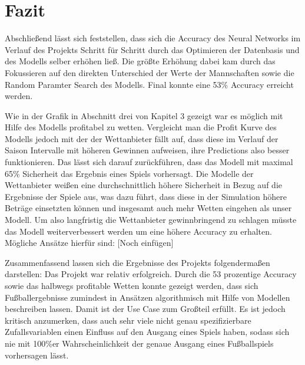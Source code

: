 \chapter{Fazit}

Abschließend lässt sich feststellen, dass sich die Accuracy des Neural Networks
im Verlauf des Projekts Schritt für Schritt durch das Optimieren der Datenbasis
und des Modells selber erhöhen ließ. Die größte Erhöhung dabei kam durch das Fokussieren
auf den direkten Unterschied der Werte der Mannschaften sowie die Random Paramter Search
des Modells. Final konnte eine 53\% Accuracy erreicht werden.

Wie in der Grafik in Abschnitt drei von Kapitel 3 gezeigt war es möglich mit Hilfe
des Modells profitabel zu wetten. Vergleicht man die Profit Kurve des Modells jedoch
mit der der Wettanbieter fällt auf, dass diese im Verlauf der Saison Intervalle mit
höheren Gewinnen aufweisen, ihre Predictions also besser funktionieren. Das lässt sich
darauf zurückführen, dass das Modell mit maximal 65\% Sicherheit das Ergebnis eines Spiels
vorhersagt. Die Modelle der Wettanbieter weißen eine durchschnittlich höhere Sicherheit in Bezug auf die
Ergebnisse der Spiele aus, was dazu führt, dass diese in der Simulation höhere Beträge
einsetzten können und insgesamt auch mehr Wetten eingehen als unser Modell.
Um also langfristig die Wettanbieter gewinnbringend zu schlagen müsste das Modell
weiterverbessert werden um eine höhere Accuracy zu erhalten. Mögliche Ansätze hierfür
sind: [Noch einfügen]

Zusammenfassend lassen sich die Ergebnisse des Projekts folgendermaßen darstellen:
Das Projekt war relativ erfolgreich. Durch die 53 prozentige Accuracy sowie das halbwegs
profitable Wetten konnte gezeigt werden, dass sich Fußballergebnisse zumindest in
Ansätzen algorithmisch mit Hilfe von Modellen beschreiben lassen. Damit ist der Use
Case zum Großteil erfüllt. Es ist jedoch kritisch anzumerken, dass auch sehr viele
nicht genau spezifizierbare Zufallsvariablen einen Einfluss auf den Ausgang
eines Spiels haben, sodass sich nie mit 100\%er Wahrscheinlichkeit der genaue Ausgang
eines Fußballspiels vorhersagen lässt.